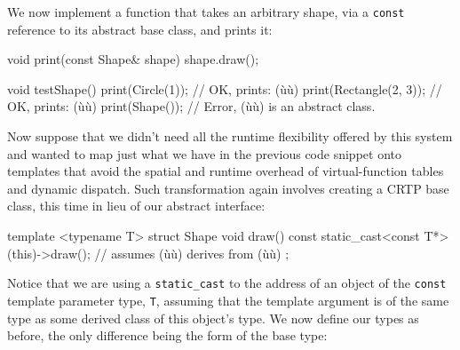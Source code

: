 We now implement a function that takes an arbitrary shape, via a
\lstinline!const!  reference to its abstract base class, and
prints it:

\begin{emcppslisting}[emcppsbatch=e6]
void print(const Shape& shape)
{
    shape.draw();
}

void testShape()
{
    print(Circle(1));        // OK, prints: (ù{}ù)
    print(Rectangle(2, 3));  // OK, prints: (ù{}ù)
    print(Shape());          // Error, (ù{}ù) is an abstract class.
}
\end{emcppslisting}
    
\noindent Now suppose that we didn't need all the runtime flexibility offered by
this system and wanted to map just what we have in the previous code
snippet onto templates that avoid the spatial and runtime overhead of
virtual-function tables and dynamic dispatch. Such transformation again
involves creating a CRTP base class, this time in lieu of our abstract
interface:

\begin{emcppslisting}[emcppsbatch=e7]
template <typename T>
struct Shape
{
    void draw() const
    {
        static_cast<const T*>(this)->draw();  // assumes (ù{}ù) derives from (ù{}ù)
    }
};
\end{emcppslisting}
    
\noindent Notice that we are using a \lstinline!static_cast! to the address of an
object of the \lstinline!const! template parameter type, \lstinline!T!,
assuming that the template argument is of the same type as some derived
class of this object's type. We now define our types as before, the only
difference being the form of the base type:

